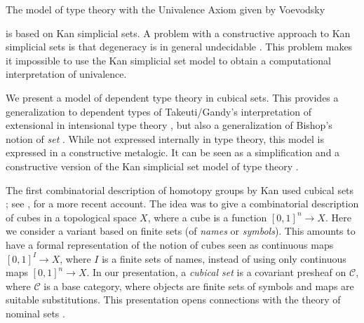 \documentclass[10pt,a4paper]{article}
\newcommand{\CC}{{\mathcal C}}
\begin{document}
The model of type theory with the Univalence Axiom given by Voevodsky

\cite{Voevodsky} is based on Kan simplicial sets.
A problem with a constructive approach to
Kan simplicial sets is that degeneracy is in general undecidable \cite{BC}.
This problem makes it impossible to use the Kan simplicial set model
to obtain a computational interpretation of univalence.

We present a model of dependent type theory in cubical sets.  This
provides a generalization to dependent types of Takeuti/Gandy's
interpretation of extensional in intensional type theory \cite{Gandy},
but also a generalization of Bishop's notion of {\em set}
\cite{Bishop}.  While not expressed internally in type theory, this
model is expressed in a constructive metalogic.  It can be seen as a
simplification and a constructive version of the Kan simplicial set
model of type theory \cite{Voevodsky}.

The first combinatorial description of homotopy groups by Kan used
cubical sets \cite{Kan}; see \cite{Crans}, \cite{Williamson} for a
more recent account.  The idea was to give a combinatorial description
of cubes in a topological space $X$, where a cube is a function
$[0,1]^n\rightarrow X$.  Here we consider a variant based on finite
sets (of \emph{names} or \emph{symbols}).  This amounts to have a
formal representation of the notion of cubes seen as continuous maps
$[0,1]^I\rightarrow X$, where $I$ is a finite sets of names, instead
of using only continuous maps $[0,1]^n\rightarrow X$.
In our presentation, a \emph{cubical set} is a covariant presheaf on
$\CC$, where $\CC$ is a base category, where objects are finite sets
of symbols and maps are suitable substitutions. This presentation
opens connections with the theory of nominal sets \cite{pitts,Pitts}.



\end{document}
